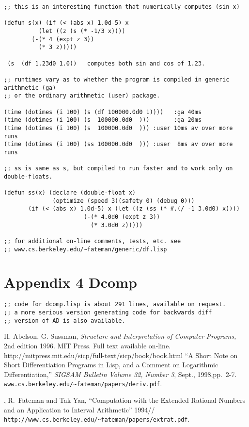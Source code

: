 \documentclass{article}
\begin{document}
{{{{\begin{verbatim}
;; this is an interesting function that numerically computes (sin x)

(defun s(x) (if (< (abs x) 1.0d-5) x 
	      (let ((z (s (* -1/3 x))))
		(-(* 4 (expt z 3))
		  (* 3 z)))))

 (s  (df 1.23d0 1.0))   computes both sin and cos of 1.23.

;; runtimes vary as to whether the program is compiled in generic arithmetic (ga)
;; or the ordinary arithmetic (user) package.

(time (dotimes (i 100) (s (df 100000.0d0 1))))   :ga 40ms
(time (dotimes (i 100) (s  100000.0d0  )))       :ga 20ms
(time (dotimes (i 100) (s  100000.0d0  ))) :user 10ms av over more runs
(time (dotimes (i 100) (ss 100000.0d0  ))) :user  8ms av over more runs

;; ss is same as s, but compiled to run faster and to work only on double-floats.

(defun ss(x) (declare (double-float x)
		      (optimize (speed 3)(safety 0) (debug 0)))
       (if (< (abs x) 1.0d-5) x (let ((z (ss (* #.(/ -1 3.0d0) x))))
					   (-(* 4.0d0 (expt z 3))
					     (* 3.0d0 z)))))

;; for additional on-line comments, tests, etc. see
;; www.cs.berkeley.edu/~fateman/generic/df.lisp
\end{verbatim}


\section*{Appendix 4 Dcomp}
\begin{verbatim}
;; code for dcomp.lisp is about 291 lines, available on request.
;; a more serious version generating code for backwards diff
;; version of AD is also available.
\end{verbatim}

\begin{thebibliography}{99}

H. Abelson, G. Sussman, {\em Structure and Interpretation of
Computer Programs,} 2nd edition 1996. MIT Press. Full text
available on-line.
http://mitpress.mit.edu/sicp/full-text/sicp/book/book.html
 ``A Short Note on Short Differentiation Programs in Lisp, and
a Comment on Logarithmic Differentiation,''
{\em SIGSAM Bulletin Volume 32, Number 3}, Sept., 1998,pp.~2-7.
\verb|www.cs.berkeley.edu/~fateman/papers/deriv.pdf|. 

,
R.~Fateman and Tak Yan,
``Computation with the Extended Rational Numbers
and an Application to Interval Arithmetic'' 1994//
\verb|http://www.cs.berkeley.edu/~fateman/papers/extrat.pdf|.


\end{thebibliography}}}}}
\end{document}
